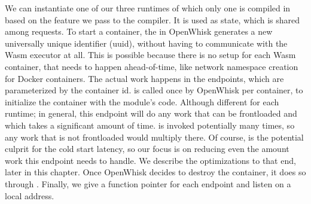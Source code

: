 We can instantiate one of our three runtimes of which only one is compiled in based on the feature we pass to the compiler. It is used as state, which is shared among requests. To start a container, the  in OpenWhisk generates a new universally unique identifier (uuid), without having to communicate with the Wasm executor at all. This is possible because there is no setup for each Wasm container, that needs to happen ahead-of-time, like network namespace creation for Docker containers. The actual work happens in the endpoints, which are parameterized by the container id.  is called once by OpenWhisk per container, to initialize the container with the module's code. Although different for each runtime; in general, this endpoint will do any work that can be frontloaded and which takes a significant amount of time.  is invoked potentially many times, so any work that is not frontloaded would multiply there. Of course,  is the potential culprit for the cold start latency, so our focus is on reducing even the amount work this endpoint needs to handle. We describe the optimizations to that end, later in this chapter. Once OpenWhisk decides to destroy the container, it does so through .
Finally, we give  a function pointer for each endpoint and listen on a local address.

